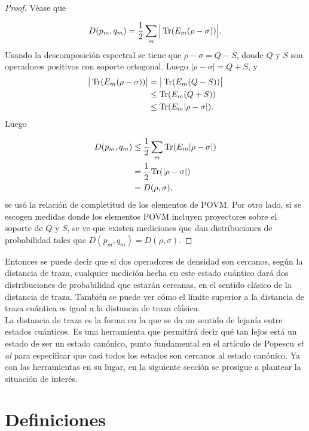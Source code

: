 \begin{proof}

Véase que 

\begin{equation}
D(p_{m},q_{m})= \frac{1}{2} \sum_{m} \Big|\Tr(E_{m}(\rho- \sigma)) \Big|.
\end{equation}
Usando la descomposición espectral se tiene que $\rho- \sigma=Q-S$, donde $Q$ y $S$ son operadores positivos con soporte ortogonal. Luego $|\rho - \sigma|= Q+S$, y
\begin{align}
\big|\Tr(E_{m}(\rho- \sigma)) \big| &= \big|\Tr(E_{m}(Q-S)) \big| \\
\quad &\leq \Tr(E_{m}(Q+S))\\
\quad &\leq \Tr(E_{m}|\rho -\sigma|).
\end{align}
Luego 

\begin{align}
D(p_{m},q_{m}) &\leq \frac{1}{2} \sum_{m} \Tr(E_{m}|\rho-\sigma|)\\
\quad &= \frac{1}{2} \Tr(|\rho -\sigma|)\\
\quad &= D(\rho,\sigma),
\end{align}
se usó la relación de completitud de los elementos de POVM. Por otro lado, si se escogen medidas donde los elementos POVM incluyen proyectores sobre el soporte de $Q$ y $S$, se ve que existen mediciones que dan distribuciones de probabilidad tales que $D(p_{m},q_{m})= D(\rho,\sigma)$.

\end{proof}
Entonces se puede decir que si dos operadores de densidad son cercanos, según la distancia de traza, cualquier medición hecha en este estado cuántico dará dos distribuciones de probabilidad que estarán cercanas, en el sentido clásico de la distancia de traza. También se puede ver cómo el límite superior a la distancia de traza cuántica es igual a la distancia de traza clásica.
\\
La distancia de traza es la forma en la que se da un sentido de lejanía entre estados cuánticos. Es una herramienta que permitirá decir qué tan lejos está un estado de ser un estado canónico, punto fundamental en el artículo de Popescu \textit{et al} para especificar que casi todos los estados son cercanos al estado canónico. Ya con las herramientas en su lugar, en la siguiente sección se prosigue a plantear la situación de interés.

\section{Definiciones}

